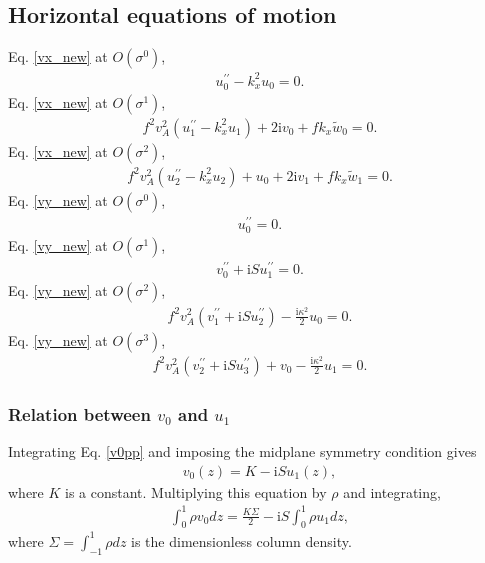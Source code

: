 \documentclass[12pt,preprint]{aastex}
\newcommand{\imgi}{\mathrm{i}}
\begin{document}
\subsection{Horizontal equations of motion}
\noindent Eq. \ref{vx_new} at $O(\sigma^0)$,
\begin{align}
  u_0^{\prime\prime} - k_x^2u_0 = 0.
\end{align}
Eq. \ref{vx_new} at $O(\sigma^1)$,
\begin{align}
  f^2v_A^2\left(u_1^{\prime\prime} - k_x^2u_1\right)  + 2 \imgi v_0 +
  f k_x \tilde{w}_0= 0. \label{vx_o1} 
\end{align}
Eq. \ref{vx_new} at $O(\sigma^2)$,
\begin{align}
  f^2v_A^2\left(u_2^{\prime\prime} - k_x^2u_2\right)  + u_0 + 2 \imgi v_1 +
  f k_x \tilde{w}_1= 0.   
\end{align}
Eq. \ref{vy_new} at $O(\sigma^0)$,
\begin{align}
  u_0^{\prime\prime} = 0.
\end{align}
Eq. \ref{vy_new} at $O(\sigma^1)$,
\begin{align}
  v_0^{\prime\prime} + \imgi S u_1^{\prime\prime} = 0.\label{v0pp}
\end{align}
Eq. \ref{vy_new} at $O(\sigma^2)$,
\begin{align}
  f^2v_A^2\left(v_1^{\prime\prime} + \imgi S u_2^{\prime\prime}\right)
  - \frac{\imgi\kappa^2}{2}u_0= 0.  
\end{align}
Eq. \ref{vy_new} at $O(\sigma^3)$,
\begin{align}
  f^2v_A^2\left(v_2^{\prime\prime} + \imgi S u_3^{\prime\prime}\right)
  + v_0 - \frac{\imgi\kappa^2}{2}u_1= 0.  \label{vy_o3} 
\end{align}

\subsubsection{Relation between $v_0$ and $u_1$}
Integrating Eq. \ref{v0pp} and imposing the midplane symmetry
condition gives
\begin{align}
  v_0(z) = K -\imgi S u_1(z),  
\end{align}
where $K$ is a constant. Multiplying this equation by $\rho$ and
integrating, 
\begin{align}
  \int_0^1\rho v_0 dz = \frac{K\Sigma}{2} - \imgi S \int_0^1\rho u_1 dz, 
\end{align}
where $\Sigma = \int_{-1}^1\rho dz$ is the dimensionless column
density. 
\end{document}
